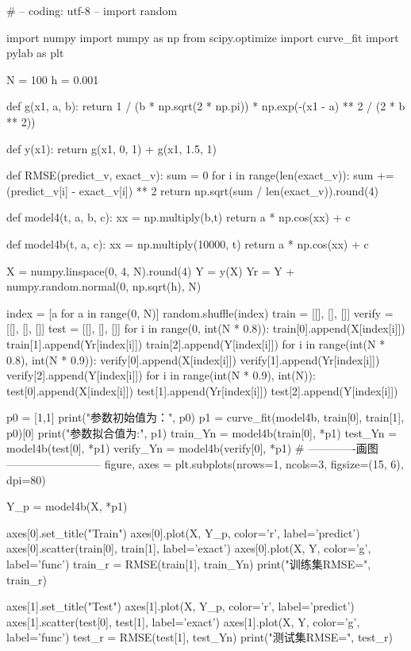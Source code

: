 \begin{python}
    # -- coding: utf-8 --
import random

import numpy
import numpy as np
from scipy.optimize import curve_fit
import pylab as plt

N = 100
h = 0.001


def g(x1, a, b):
    return 1 / (b * np.sqrt(2 * np.pi)) * np.exp(-(x1 - a) ** 2 / (2 * b ** 2))


def y(x1):
    return g(x1, 0, 1) + g(x1, 1.5, 1)


def RMSE(predict_v, exact_v):
    sum = 0
    for i in range(len(exact_v)):
        sum += (predict_v[i] - exact_v[i]) ** 2
    return np.sqrt(sum / len(exact_v)).round(4)


def model4(t, a, b, c):
    xx = np.multiply(b,t)
    return a * np.cos(xx) + c


def model4b(t, a, c):
    xx = np.multiply(10000, t)
    return a * np.cos(xx) + c


X = numpy.linspace(0, 4, N).round(4)
Y = y(X)
Yr = Y + numpy.random.normal(0, np.sqrt(h), N)

index = [a for a in range(0, N)]
random.shuffle(index)
train = [[], [], []]
verify = [[], [], []]
test = [[], [], []]
for i in range(0, int(N * 0.8)):
    train[0].append(X[index[i]])
    train[1].append(Yr[index[i]])
    train[2].append(Y[index[i]])
for i in range(int(N * 0.8), int(N * 0.9)):
    verify[0].append(X[index[i]])
    verify[1].append(Yr[index[i]])
    verify[2].append(Y[index[i]])
for i in range(int(N * 0.9), int(N)):
    test[0].append(X[index[i]])
    test[1].append(Yr[index[i]])
    test[2].append(Y[index[i]])

p0 = [1,1]
print("参数初始值为：", p0)
p1 = curve_fit(model4b, train[0], train[1], p0)[0]
print("参数拟合值为:", p1)
train_Yn = model4b(train[0], *p1)
test_Yn = model4b(test[0], *p1)
verify_Yn = model4b(verify[0], *p1)
# -------------画图--------------------------
figure, axes = plt.subplots(nrows=1, ncols=3, figsize=(15, 6), dpi=80)

Y_p = model4b(X, *p1)

axes[0].set_title("Train")
axes[0].plot(X, Y_p, color='r', label='predict')
axes[0].scatter(train[0], train[1], label='exact')
axes[0].plot(X, Y, color='g', label='func')
train_r = RMSE(train[1], train_Yn)
print("训练集RMSE=", train_r)

axes[1].set_title("Test")
axes[1].plot(X, Y_p, color='r', label='predict')
axes[1].scatter(test[0], test[1], label='exact')
axes[1].plot(X, Y, color='g', label='func')
test_r = RMSE(test[1], test_Yn)
print("测试集RMSE=", test_r)


\end{python}
